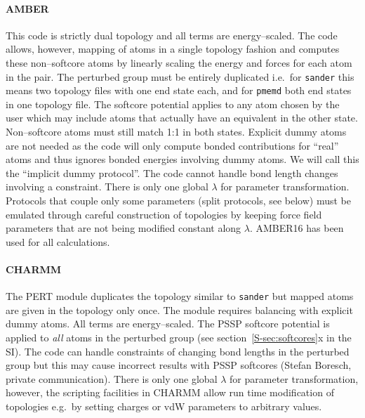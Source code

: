\documentclass[journal=jctcce,manuscript=article]{achemso}
\newcommand{\progname}[1]{\texttt{#1}}
\begin{document}
\paragraph{AMBER}
This code is strictly dual topology and all terms are energy--scaled.  The code allows, however, mapping of atoms in a single topology fashion and computes these non--softcore atoms  by linearly scaling the energy and forces for each atom in the pair.  The perturbed group must be entirely duplicated i.e.\ for \progname{sander} this means two topology files with one end state each, and for \progname{pmemd} both end states in one topology file.  The softcore potential applies to any atom chosen by the user which may include atoms that actually have an equivalent in the other state.  Non--softcore atoms must still match 1:1 in both states.  Explicit dummy atoms are not needed as the code will only compute bonded contributions for ``real'' atoms and thus ignores bonded energies involving dummy atoms.  We will call this the ``implicit dummy protocol''. The code cannot handle bond length changes involving a constraint.  There is only one global $\lambda$ for parameter transformation.  Protocols that couple only some parameters (split protocols, see below) must be emulated through careful construction of topologies by keeping force field parameters that are not being modified constant along $\lambda$.  AMBER16 has been used for all calculations.

\paragraph{CHARMM} The PERT module duplicates the topology similar to
\progname{sander} but mapped atoms are given in the topology only once.
The module requires balancing with explicit dummy atoms.  All terms are
energy--scaled.  The PSSP softcore potential is applied to \emph{all}
atoms in the perturbed group (see section~\ref{S-sec:softcores}x in the SI).  
The 
code can handle constraints of changing bond lengths in the perturbed group but 
this
may cause incorrect results with PSSP softcores (Stefan Boresch, private
communication).  There is only one global $\lambda$ for parameter
transformation, however, the scripting facilities in CHARMM allow run time
modification of topologies e.g.\ by setting charges or vdW parameters
to arbitrary values.
\end{document}
